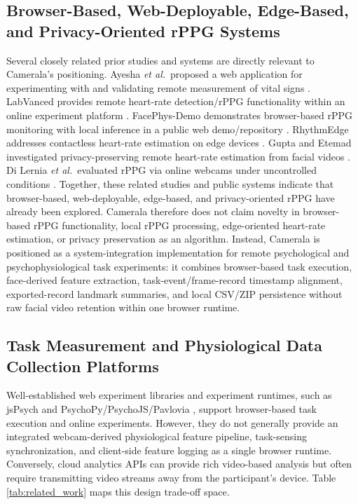 \documentclass[dvipdfmx]{ehis}
\newcommand{\etal}{\textit{et al.}}
\begin{document}
\subsection{Browser-Based, Web-Deployable, Edge-Based, and Privacy-Oriented rPPG Systems}
Several closely related prior studies and systems are directly relevant to Camerala's positioning.
Ayesha \etal\ proposed a web application for experimenting with and validating remote measurement of vital signs \cite{ayesha_web_vital}.
LabVanced provides remote heart-rate detection/rPPG functionality within an online experiment platform \cite{labvanced_rppg}.
FacePhys-Demo demonstrates browser-based rPPG monitoring with local inference in a public web demo/repository \cite{facephys_demo}.
RhythmEdge addresses contactless heart-rate estimation on edge devices \cite{rhythmedge}.
Gupta and Etemad investigated privacy-preserving remote heart-rate estimation from facial videos \cite{gupta_privacy}.
Di Lernia \etal\ evaluated rPPG via online webcams under uncontrolled conditions \cite{di_lernia_rppg_wild}.
Together, these related studies and public systems indicate that browser-based, web-deployable, edge-based, and privacy-oriented rPPG have already been explored.
Camerala therefore does not claim novelty in browser-based rPPG functionality, local rPPG processing, edge-oriented heart-rate estimation, or privacy preservation as an algorithm.
Instead, Camerala is positioned as a system-integration implementation for remote psychological and psychophysiological task experiments: it combines browser-based task execution, face-derived feature extraction, task-event/frame-record timestamp alignment, exported-record landmark summaries, and local CSV/ZIP persistence without raw facial video retention within one browser runtime.

\subsection{Task Measurement and Physiological Data Collection Platforms}
Well-established web experiment libraries and experiment runtimes, such as jsPsych \cite{jspsych_joss} and PsychoPy/PsychoJS/Pavlovia \cite{psychopy2}, support browser-based task execution and online experiments.
However, they do not generally provide an integrated webcam-derived physiological feature pipeline, task-sensing synchronization, and client-side feature logging as a single browser runtime.
Conversely, cloud analytics APIs can provide rich video-based analysis but often require transmitting video streams away from the participant's device.
Table \ref{tab:related_work} maps this design trade-off space.
\end{document}
